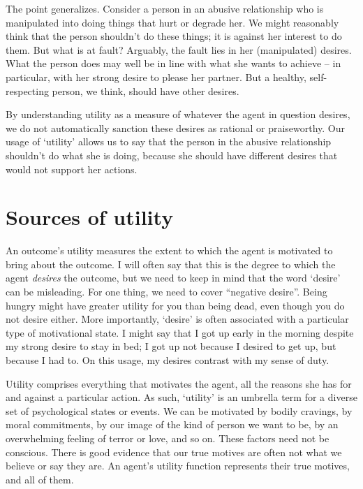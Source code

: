 The point generalizes. Consider a person in an abusive relationship who is
manipulated into doing things that hurt or degrade her. We might reasonably
think that the person shouldn't do these things; it is against her interest to
do them. But what is at fault? Arguably, the fault lies in her (manipulated)
desires. What the person does may well be in line with what she wants to achieve
-- in particular, with her strong desire to please her partner. But a healthy,
self-respecting person, we think, should have other desires.

By understanding utility as a measure of whatever the agent in question desires,
we do not automatically sanction these desires as rational or praiseworthy. Our
usage of `utility' allows us to say that the person in the abusive relationship
shouldn't do what she is doing, because she should have different desires that
would not support her actions.


\section{Sources of utility}\label{sec:sources-utility}

An outcome's utility measures the extent to which the agent is motivated to
bring about the outcome. I will often say that this is the degree to which the
agent \emph{desires} the outcome, but we need to keep in mind that the word
`desire' can be misleading. For one thing, we need to cover ``negative desire''.
Being hungry might have greater utility for you than being dead, even though you
do not desire either. More importantly, `desire' is often associated with a
particular type of motivational state. I might say that I got up early in the
morning despite my strong desire to stay in bed; I got up not because I desired
to get up, but because I had to. On this usage, my desires contrast with my
sense of duty.

Utility comprises everything that motivates the agent, all the reasons she has
for and against a particular action. As such, `utility' is an umbrella term for
a diverse set of psychological states or events. We can be motivated by bodily
cravings, by moral commitments, by our image of the kind of person we want to
be, by an overwhelming feeling of terror or love, and so on. These factors need
not be conscious. There is good evidence that our true motives are often not
what we believe or say they are. An agent's utility function represents their true
motives, and all of them.

